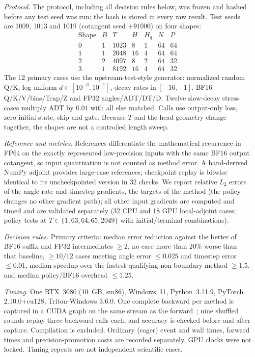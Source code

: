\emph{Protocol.} The protocol, including all decision rules below, was frozen and hashed before any test seed was run; the hash is stored in every raw result. Test seeds are 1009, 1013 and 1019 (cotangent seed $+91000$) on four shapes:
\[\begin{array}{rrrrrrr}\text{Shape}&B&T&H&H_q&N&P\\\hline
0&1&1023&8&1&64&64\\1&1&2048&16&4&64&64\\2&2&4097&8&2&64&32\\3&1&8192&16&4&64&32\end{array}\]
The 12 primary cases use the upstream-test-style generator: normalized random Q/K, log-uniform $d\in[10^{-3},10^{-1}]$, decay rates in $[-16,-1]$, BF16 Q/K/V/bias/Trap/Z and FP32 angles/ADT/DT/D. Twelve slow-decay stress cases multiply ADT by $0.01$ with all else matched. Calls use output-only loss, zero initial state, skip and gate. Because $T$ and the head geometry change together, the shapes are not a controlled length sweep.

\emph{Reference and metrics.} References differentiate the mathematical recurrence in FP64 on the exactly represented low-precision inputs with the same BF16 output cotangent, so input quantization is not counted as method error. A hand-derived NumPy adjoint provides large-case references; checkpoint replay is bitwise identical to its uncheckpointed version in 32 checks. We report relative $L_2$ errors of the angle-rate and timestep gradients, the targets of the method (the policy changes no other gradient path); all other input gradients are computed and timed and are validated separately (32 CPU and 18 GPU local-adjoint cases; policy tests at $T\in\{1,63,64,65,2049\}$ with initial/terminal combinations).

\emph{Decision rules.} Primary criteria: median error reduction against the better of BF16 suffix and FP32 intermediates $\ge2$, no case more than 20\% worse than that baseline, $\ge10/12$ cases meeting angle error $\le0.025$ and timestep error $\le0.01$, median speedup over the fastest qualifying non-boundary method $\ge1.5$, and median policy/BF16 overhead $\le1.25$.

\emph{Timing.} One RTX~3080 (10~GB, sm86), Windows~11, Python~3.11.9, PyTorch 2.10.0+cu128, Triton-Windows 3.6.0. One complete backward per method is captured in a CUDA graph on the same stream as the forward~\cite{torch}; nine shuffled rounds replay three backward calls each, and accuracy is checked before and after capture. Compilation is excluded. Ordinary (eager) event and wall times, forward times and precision-promotion costs are recorded separately. GPU clocks were not locked. Timing repeats are not independent scientific cases.

